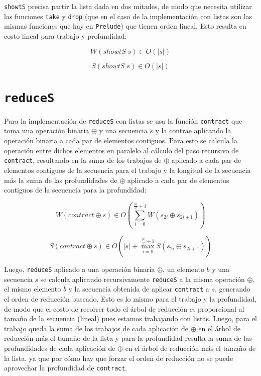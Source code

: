 \documentclass[a4paper,10pt]{article}
\begin{document}
\texttt{showtS} precisa partir la lista dada en dos mitades, de modo que necesita
utilizar las funciones \texttt{take} y \texttt{drop} (que en el caso de la
implementación con listas son las mismas funciones que hay en \texttt{Prelude})
que tienen orden lineal. Esto resulta en costo lineal para trabajo y profundidad:

\begin{equation*}
    W \left( showtS \; s \right) \in
    O \left( \vert s \vert \right)
\end{equation*}

\begin{equation*}
    S \left( showtS \; s \right) \in
    O \left( \vert s \vert \right)
\end{equation*}


\section*{\texttt{reduceS}}

Para la implementación de \texttt{reduceS} con listas se usa la función \texttt{contract}
que toma una operación binaria $\oplus$ y una secuencia $s$ y la contrae aplicando
la operación binaria a cada par de elementos contiguos. Para esto se calcula la
operación entre dichos elementos en paralelo al cálculo del paso recursivo de
\texttt{contract}, resultando en la suma de los trabajos de $\oplus$ aplicado a
cada par de elementos contiguos de la secuencia para el trabajo y la longitud de
la secuencia más la suma de las profundidades de $\oplus$ aplicado a cada par de
elementos contiguos de la secuencia para la profundidad:

\begin{equation*}
    W \left( contract \oplus s \right) \in
    O \left( \sum_{i=0}^{\frac{\vert s \vert}{2} + 1} W \left( s_{2i} \oplus s_{2i+1} \right) \right)
\end{equation*}

\begin{equation*}
    S \left( contract \oplus s \right) \in
    O \left( \vert s \vert + \max_{i=0}^{\frac{\vert s \vert}{2} + 1} S \left( s_{2i} \oplus s_{2i+1} \right) \right)
\end{equation*}

Luego, \texttt{reduceS} aplicado a una operación binaria $\oplus$, un elemento $b$
y una secuencia $s$ se calcula aplicando recursivamente \texttt{reduceS} a la
misma operación $\oplus$, el mismo elemento $b$ y la secuencia obtenida de aplicar
\texttt{contract} a $s$, generando el orden de reducción buscado. Esto es lo mismo
para el trabajo y la profundidad, de modo que el costo de recorrer todo el árbol
de reducción es proporcional al tamaño de la secuencia (lineal) pues estamos
trabajando con listas. Luego, para el trabajo queda la suma de los trabajos de
cada aplicación de $\oplus$ en el árbol de reducción más el tamaño de la lista y
para la profundidad resulta la suma de las profundidades de cada aplicación de
$\oplus$ en el árbol de reducción más el tamaño de la lista, ya que por cómo hay
que forzar el orden de reducción no se puede aprovechar la profundidad de \texttt{contract}.
\end{document}
